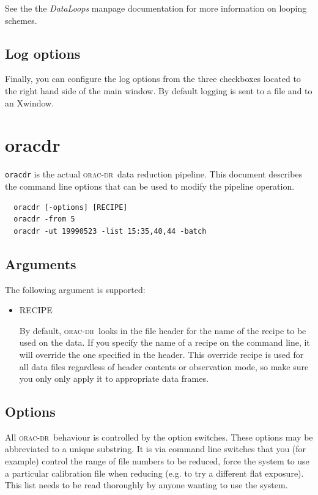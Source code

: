 \documentclass[twoside,11pt]{article}
\newcommand{\xlabel}[1]{}
\renewcommand{\_}{\texttt{\symbol{95}}}
\newcommand{\oracdr}{\textsc{orac-dr}}
\begin{document}
See the the \emph{DataLoops} manpage documentation for more information on looping
schemes.

\subsection*{Log options}

Finally, you can configure the log options from the three checkboxes
located to the right hand side of the main window. By default logging
is sent to a file and to an Xwindow.

\section{oracdr\label{oracdr}\xlabel{oracdr}}

\texttt{oracdr} is the actual \oracdr\ data reduction pipeline. 
This document describes the command line options that
can be used to modify the pipeline operation.

\begin{verbatim}
  oracdr [-options] [RECIPE]
  oracdr -from 5
  oracdr -ut 19990523 -list 15:35,40,44 -batch
\end{verbatim}

\subsection*{Arguments\label{oracdr_Arguments}}

The following argument  is  supported:

\begin{itemize}
\item RECIPE

By default, \oracdr\ looks in the file header for the name of the
recipe to be used on the data. If you specify the name of a recipe on
the command line, it will override the one specified in the
header. This override recipe is used for all data files regardless of
header contents or observation mode, so make sure you only only apply
it to appropriate data frames.

\end{itemize}
\subsection*{Options\label{oracdr_Options}}

All \oracdr\ behaviour is controlled by the option
switches. These options may be abbreviated to a unique substring. It
is via command line switches that you (for example) control the range
of file numbers to be reduced, force the system to use a particular
calibration file when reducing (e.g. to try a different flat
exposure). This list needs to be read thoroughly by anyone wanting to
use the system.
\end{document}
